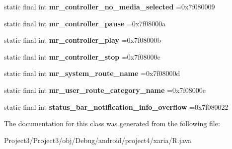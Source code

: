 \begin{DoxyCompactItemize}
\item 
\mbox{\label{classproject4_1_1xaria_1_1R_1_1string_a2dffc16eadc845a59ad8c647895db755}} 
static final int {\bfseries mr\+\_\+controller\+\_\+no\+\_\+media\+\_\+selected} =0x7f080009
\item 
\mbox{\label{classproject4_1_1xaria_1_1R_1_1string_a640a21667816630f85826d5646e36630}} 
static final int {\bfseries mr\+\_\+controller\+\_\+pause} =0x7f08000a
\item 
\mbox{\label{classproject4_1_1xaria_1_1R_1_1string_a89c9f07eff007b415fefb9cb6a668445}} 
static final int {\bfseries mr\+\_\+controller\+\_\+play} =0x7f08000b
\item 
\mbox{\label{classproject4_1_1xaria_1_1R_1_1string_a925ab1cee4af1f747ea141efc262e0e6}} 
static final int {\bfseries mr\+\_\+controller\+\_\+stop} =0x7f08000c
\item 
\mbox{\label{classproject4_1_1xaria_1_1R_1_1string_a75ff2957dc7442f162fbc985d1a1dd4b}} 
static final int {\bfseries mr\+\_\+system\+\_\+route\+\_\+name} =0x7f08000d
\item 
\mbox{\label{classproject4_1_1xaria_1_1R_1_1string_a2613956e7e5dfb80651f3775a99f2305}} 
static final int {\bfseries mr\+\_\+user\+\_\+route\+\_\+category\+\_\+name} =0x7f08000e
\item 
\mbox{\label{classproject4_1_1xaria_1_1R_1_1string_ad18e742332f64f510b3018fcb11787ff}} 
static final int {\bfseries status\+\_\+bar\+\_\+notification\+\_\+info\+\_\+overflow} =0x7f080022
\end{DoxyCompactItemize}


The documentation for this class was generated from the following file\+:\begin{DoxyCompactItemize}
\item 
Project3/\+Project3/obj/\+Debug/android/project4/xaria/R.\+java\end{DoxyCompactItemize}
